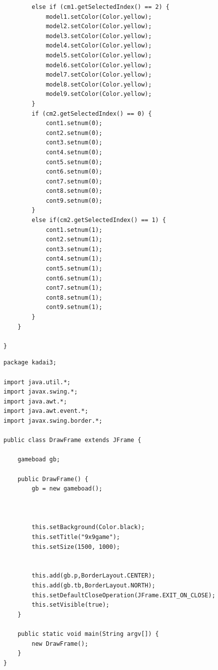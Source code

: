 \documentclass[12pt, a4paper, titlepage]{jsarticle}
\begin{document}
\begin{screen}
\begin{verbatim}
		else if (cm1.getSelectedIndex() == 2) {
			model1.setColor(Color.yellow);
			model2.setColor(Color.yellow);
			model3.setColor(Color.yellow);
			model4.setColor(Color.yellow);
			model5.setColor(Color.yellow);
			model6.setColor(Color.yellow);
			model7.setColor(Color.yellow);
			model8.setColor(Color.yellow);
			model9.setColor(Color.yellow);
		} 
		if (cm2.getSelectedIndex() == 0) {
			cont1.setnum(0);
			cont2.setnum(0);
			cont3.setnum(0);
			cont4.setnum(0);
			cont5.setnum(0);
			cont6.setnum(0);
			cont7.setnum(0);
			cont8.setnum(0);
			cont9.setnum(0);
		}
		else if(cm2.getSelectedIndex() == 1) {
			cont1.setnum(1);
			cont2.setnum(1);
			cont3.setnum(1);
			cont4.setnum(1);
			cont5.setnum(1);
			cont6.setnum(1);
			cont7.setnum(1);
			cont8.setnum(1);
			cont9.setnum(1);
		}
	}

}
\end{verbatim}
\end{screen}
\begin{screen}
\begin{verbatim}
package kadai3;

import java.util.*;
import javax.swing.*;
import java.awt.*;
import java.awt.event.*;
import javax.swing.border.*;

public class DrawFrame extends JFrame {
	
	gameboad gb;
	
	public DrawFrame() {
		gb = new gameboad();
		
		
		
		this.setBackground(Color.black);
		this.setTitle("9x9game");
		this.setSize(1500, 1000);
		
		
		this.add(gb.p,BorderLayout.CENTER);
		this.add(gb.tb,BorderLayout.NORTH);
		this.setDefaultCloseOperation(JFrame.EXIT_ON_CLOSE);
		this.setVisible(true);
	}

	public static void main(String argv[]) {
		new DrawFrame();
	}
}

\end{verbatim}
\end{screen}
\end{document}
